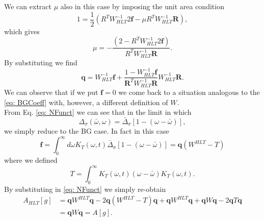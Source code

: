 \documentclass[a4paper,10pt]{article}
\begin{document}
We can extract $\mu$ also in this case by imposing the unit area condition 
\begin{equation}
1 = \frac{1}{2}(R^TW_{HLT}^{-1}2\textbf{f} - \mu R^T W_{HLT}^{-1}\textbf{R} ), 
\end{equation}
which gives
\begin{equation}
\mu  = -\frac{(2-  R^TW_{HLT}^{-1}2\textbf{f})}{R^T W_{HLT}^{-1}\textbf{R} }.
\end{equation}
By substituting we find 
\begin{equation}\label{eq: CoeffN}
\textbf{q} =  W^{-1}_{HLT} \textbf{f} +   \frac{1-W^{-1}_{HLT} \textbf{f}}{\textbf{R}^TW^{-1}_{HLT}\textbf{R}}W^{-1}_{HLT}\textbf{R}.
\end{equation}
We can observe that if we put $\textbf{f}=0$ we come back to a situation analogous to the \eqref{eq: BGCoeff} with, however, a different definition of $W$.\\
From Eq. \eqref{eq: NFunct} we can see that in the limit in which
\begin{equation}
\Delta_\sigma(\bar{\omega}, \omega) = \bar{\Delta}_\sigma[1-(\omega-\bar{\omega})],
\end{equation}
we simply reduce to the BG case. In fact in this case 
\begin{equation}\label{eq: fSub}
\textbf{f} = \int_0^\infty d\omega K_T(\omega,t) \bar{\Delta}_\sigma[1-(\omega-\bar{\omega})] = \textbf{q}(W^{HLT}-T)
\end{equation}
where we defined
\begin{equation}
T = \int_0^\infty K_T(\omega,t)(\omega-\bar{\omega})K_T(\omega,t).
\end{equation}
By substituting in \eqref{eq: NFunct} we simply re-obtain 
\begin{equation}\begin{split}
A_{HLT}[g] & = \textbf{q} W^{HLT} \textbf{q} - 2\textbf{q} (W^{HLT}-T)\textbf{q}  + \textbf{q}W^{HLT}\textbf{q}  + \textbf{q}W\textbf{q} - 2\textbf{q} T \textbf{q}  \\ & = \textbf{q}W\textbf{q} = A[g].
\end{split}\end{equation}
\end{document}

